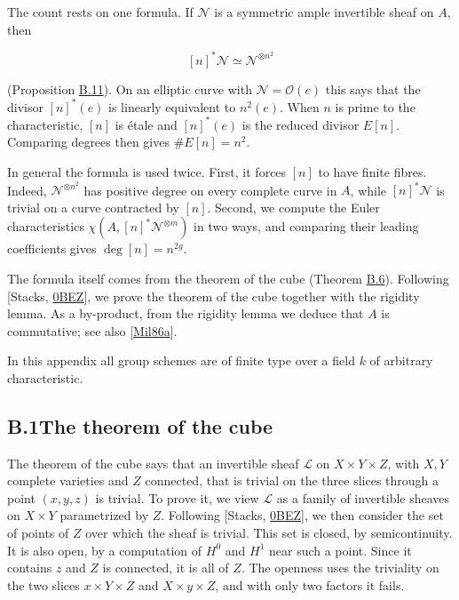 \documentclass[11pt]{article}
\begin{document}
The count rests on one formula. If \(\mathcal N\) is a symmetric ample invertible sheaf on \(A\), then

\[
[n]^*\mathcal N\simeq\mathcal N^{\otimes n^2}
\]

(Proposition \hyperref[bp31]{B.11}). On an elliptic curve with \(\mathcal N=\mathcal O(e)\) this says that the divisor \([n]^*(e)\) is linearly equivalent to \(n^2(e)\). When \(n\) is prime to the characteristic, \([n]\) is étale and \([n]^*(e)\) is the reduced divisor \(E[n]\). Comparing degrees then gives \(\#E[n]=n^2\).

In general the formula is used twice. First, it forces \([n]\) to have finite fibres. Indeed, \(\mathcal N^{\otimes n^2}\) has positive degree on every complete curve in \(A\), while \([n]^*\mathcal N\) is trivial on a curve contracted by \([n]\). Second, we compute the Euler characteristics \(\chi(A,[n]^*\mathcal N^{\otimes m})\) in two ways, and comparing their leading coefficients gives \(\deg[n]=n^{2g}\).

The formula itself comes from the theorem of the cube (Theorem \hyperref[bp17]{B.6}). Following [Stacks, \href{https://stacks.math.columbia.edu/tag/0BEZ}{0BEZ}], we prove the theorem of the cube together with the rigidity lemma. As a by-product, from the rigidity lemma we deduce that \(A\) is commutative; see also [\hyperref[bp45]{Mil86a}].

In this appendix all group schemes are of finite type over a field \(k\) of arbitrary characteristic.

\subsection*{\texorpdfstring{B.1\quad The theorem of the cube}{B.1 The theorem of the cube}}
\label{bp3}%
\label{bp4}%
The theorem of the cube says that an invertible sheaf \(\mathcal L\) on \(X\times Y\times Z\), with \(X,Y\) complete varieties and \(Z\) connected, that is trivial on the three slices through a point \((x,y,z)\) is trivial. To prove it, we view \(\mathcal L\) as a family of invertible sheaves on \(X\times Y\) parametrized by \(Z\). Following [Stacks, \href{https://stacks.math.columbia.edu/tag/0BEZ}{0BEZ}], we then consider the set of points of \(Z\) over which the sheaf is trivial. This set is closed, by semicontinuity. It is also open, by a computation of \(H^0\) and \(H^1\) near such a point. Since it contains \(z\) and \(Z\) is connected, it is all of \(Z\). The openness uses the triviality on the two slices \(x\times Y\times Z\) and \(X\times y\times Z\), and with only two factors it fails.
\end{document}
